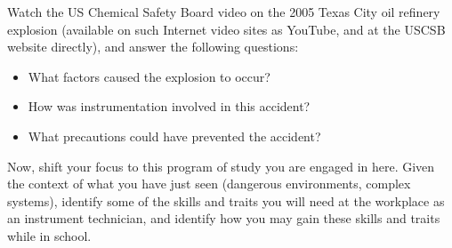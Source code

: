 

Watch the US Chemical Safety Board video on the 2005 Texas City oil refinery explosion (available on such Internet video sites as YouTube, and at the USCSB website directly), and answer the following questions:

\begin{itemize}
\item{} What factors caused the explosion to occur?
\vskip 10pt
\item{} How was instrumentation involved in this accident?
\vskip 10pt
\item{} What precautions could have prevented the accident?
\end{itemize}

\vskip 10pt

Now, shift your focus to this program of study you are engaged in here.  Given the context of what you have just seen (dangerous environments, complex systems), identify some of the skills and traits you will need at the workplace as an instrument technician, and identify how you may gain these skills and traits while in school.


















